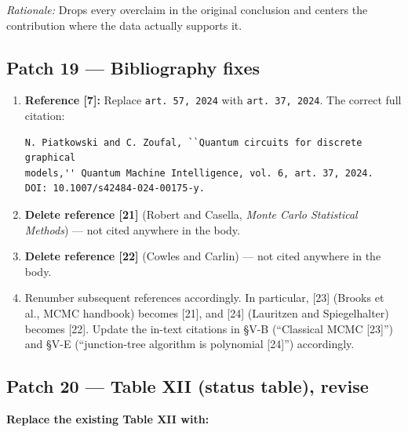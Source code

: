 \noindent\emph{Rationale:} Drops every overclaim in the original conclusion
and centers the contribution where the data actually supports it.

\subsection*{Patch 19 --- Bibliography fixes}

\begin{enumerate}
\item \textbf{Reference [7]:} Replace
\verb|art. 57, 2024| with \verb|art. 37, 2024|.  The correct full citation:

\begin{verbatim}
N. Piatkowski and C. Zoufal, ``Quantum circuits for discrete graphical
models,'' Quantum Machine Intelligence, vol. 6, art. 37, 2024.
DOI: 10.1007/s42484-024-00175-y.
\end{verbatim}

\item \textbf{Delete reference [21]} (Robert and Casella, \emph{Monte Carlo
Statistical Methods}) --- not cited anywhere in the body.

\item \textbf{Delete reference [22]} (Cowles and Carlin) --- not cited
anywhere in the body.

\item Renumber subsequent references accordingly.  In particular,
[23] (Brooks et al., MCMC handbook) becomes [21], and [24] (Lauritzen and
Spiegelhalter) becomes [22].  Update the in-text citations in \S V-B
(``Classical MCMC [23]'') and \S V-E (``junction-tree algorithm is
polynomial [24]'') accordingly.
\end{enumerate}

\subsection*{Patch 20 --- Table XII (status table), revise}

\textbf{Replace the existing Table XII with:}

